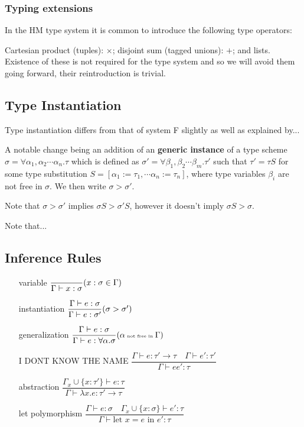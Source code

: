 \subsubsection{Typing extensions}

In the HM type system it is common to introduce the following type operators:

Cartesian product (tuples): $\times$; disjoint sum (tagged unions): $+$; and lists. Existence of these is not required for the type system and so we will avoid them going forward, their reintroduction is trivial.

\subsection{Type Instantiation}

Type instantiation differs from that of system F slightly as well as explained  by... %

A notable change being an addition of an \textbf{generic instance} of a type scheme $\sigma = \forall \alpha_1, \alpha_2 \cdots \alpha_n . \tau$ which is defined as $\sigma' = \forall \beta_1, \beta_2 \cdots \beta_m . \tau'$ such that
$\tau' = \tau S$ for some type substitution $S = [\alpha_1 := \tau_1, \cdots \alpha_n := \tau_n]$, where type variables $\beta_i$ are not free in $\sigma$. We then write $\sigma > \sigma'$.

Note that $\sigma > \sigma'$ implies $\sigma S > \sigma' S$, however it doesn't imply $\sigma S > \sigma$.

Note that... %

\subsection{Inference Rules}

\begin{itemize}
    \item[variable] $\dfrac{}{\Gamma \vdash x : \sigma}\tiny{(x : \sigma \in \Gamma)}$
    \item[instantiation] $\dfrac{\Gamma \vdash e : \sigma}{\Gamma \vdash e : \sigma'}\tiny{(\sigma > \sigma')}$
    \item[generalization] $\dfrac{\Gamma \vdash e : \sigma}{\Gamma \vdash e : \forall \alpha . \sigma}\tiny{(\alpha \text{ not free in }\Gamma)}$
    \item[I DONT KNOW THE NAME] $\dfrac{\Gamma \vdash e : \tau' \rightarrow \tau \quad \Gamma \vdash e' : \tau' }{\Gamma \vdash e e' : \tau}$ %
    \item[abstraction] $\dfrac{\Gamma_x \cup \{x : \tau'\} \vdash e : \tau}{\Gamma \vdash \lambda x . e : \tau' \rightarrow \tau}$
    \item[let polymorphism] $\dfrac{\Gamma \vdash e : \sigma \quad \Gamma_x \cup \{x :\sigma\} \vdash e' : \tau}{\Gamma \vdash \text{let } x = e \text{ in } e' : \tau}$
\end{itemize}

